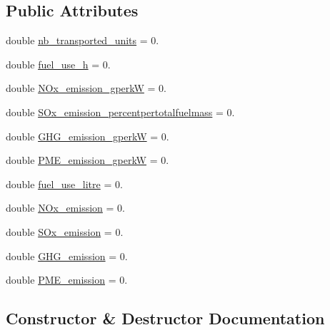 \subsection*{Public Attributes}
\begin{DoxyCompactItemize}
\item 
double \mbox{\hyperlink{struct_ships_stats_1_1_stat_data_a5ec1656a6e4a363f2c2922fb6c9117fd}{nb\+\_\+transported\+\_\+units}} = 0.
\item 
double \mbox{\hyperlink{struct_ships_stats_1_1_stat_data_a7d752d049c0320308e9e48dd9a2fad30}{fuel\+\_\+use\+\_\+h}} = 0.
\item 
double \mbox{\hyperlink{struct_ships_stats_1_1_stat_data_a398b2e3cc0319f2157c072ec15b07ac4}{N\+Ox\+\_\+emission\+\_\+gperkW}} = 0.
\item 
double \mbox{\hyperlink{struct_ships_stats_1_1_stat_data_a9c45e474611404b10a510cd9cbc7fcaf}{S\+Ox\+\_\+emission\+\_\+percentpertotalfuelmass}} = 0.
\item 
double \mbox{\hyperlink{struct_ships_stats_1_1_stat_data_abf7f31c3907f4cae0ae3f63dee204f9f}{G\+H\+G\+\_\+emission\+\_\+gperkW}} = 0.
\item 
double \mbox{\hyperlink{struct_ships_stats_1_1_stat_data_a156bf553597129d7df3cfb243cdf18a0}{P\+M\+E\+\_\+emission\+\_\+gperkW}} = 0.
\item 
double \mbox{\hyperlink{struct_ships_stats_1_1_stat_data_ab09394d99b6490ae78cb262e31d4e7ed}{fuel\+\_\+use\+\_\+litre}} = 0.
\item 
double \mbox{\hyperlink{struct_ships_stats_1_1_stat_data_a8e1fcb8bac99f1bab0b37fc24e6b923f}{N\+Ox\+\_\+emission}} = 0.
\item 
double \mbox{\hyperlink{struct_ships_stats_1_1_stat_data_a86b27abc7d6fe93c66fb96208adc7c4c}{S\+Ox\+\_\+emission}} = 0.
\item 
double \mbox{\hyperlink{struct_ships_stats_1_1_stat_data_a6de65c28cc0289ce0fc33ce8a7dd8044}{G\+H\+G\+\_\+emission}} = 0.
\item 
double \mbox{\hyperlink{struct_ships_stats_1_1_stat_data_aa8b21b558bcfe720eeb87d084a6e0490}{P\+M\+E\+\_\+emission}} = 0.
\end{DoxyCompactItemize}


\subsection{Constructor \& Destructor Documentation}
\mbox{\label{struct_ships_stats_1_1_stat_data_a845e7985d983968c880a3e7d50257463}} 
